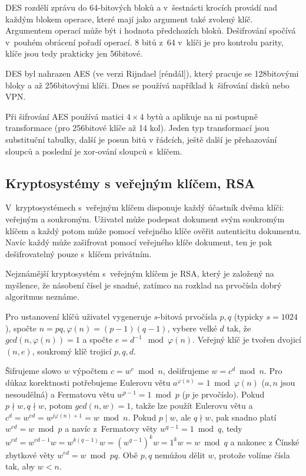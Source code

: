 DES rozdělí zprávu do 64-bitových bloků
a v~šestnácti krocích provádí nad každým blokem operace, které mají jako
argument také zvolený klíč. Argumentem operací může být i hodnota
předchozích bloků. Dešifrování spočívá v~pouhém obrácení pořadí operací.
8 bitů z~64 v~klíči je pro kontrolu parity, klíče jsou tedy prakticky
jen 56bitové.

DES byl nahrazen AES (ve verzi Rijndael [réndál]), který pracuje se
128bitovými bloky a až 256bitovými klíči. Dnes se používá například
k~šifrování disků nebo VPN.

Při šifrování AES používá matici $4 \times 4$ bytů a aplikuje na ni
postupně transformace (pro 256bitové klíče až 14 kol).
Jeden typ transformací jsou substituční tabulky,
další je posun bitů v řádcích,
ještě další je přehazování sloupců
a poslední je xor-ování sloupců s~klíčem.

\subsection{Kryptosystémy s veřejným klíčem, RSA}

V~kryptosystémech s~veřejným klíčem disponuje každý účastník dvěma
klíči: veřejným a soukromým. Uživatel může podepsat dokument svým
soukromým klíčem a každý potom může pomocí veřejného klíče ověřit
autenticitu dokumentu. Navíc každý může zašifrovat pomocí veřejného
klíče dokument, ten je pak dešifrovatelný pouze s~klíčem privátním.

Nejznámější kryptosystém s~veřejným klíčem je RSA, který je založený na
myšlence, že násobení čísel je snadné, zatímco na rozklad na prvočísla
dobrý algoritmus neznáme.

Pro ustanovení klíčů uživatel vygeneruje $s$-bitová prvočísla $p,q$
(typicky $s = 1024$), spočte $n = pq, \varphi(n) = (p-1)(q-1)$,
vybere velké $d$ tak, že $gcd(n, \varphi(n)) = 1$
a spočte $e = d^{-1} \mod \varphi(n)$. Veřejný klíč je tvořen dvojicí
$(n, e)$, soukromý klíč trojicí $p,q,d$.

Šifrujeme slowo $w$ výpočtem $c = w^e \bmod n$,
dešifrujeme $w = c^d \bmod n$.
Pro důkaz korektnosti potřebujeme Eulerovu větu $a^{\varphi(n)} = 1
\bmod \varphi(n)$ ($a,n$ jsou nesoudělná)
a Fermatovu větu $w^{p-1} = 1 \bmod p$ ($p$ je prvočíslo).
Pokud $p \nmid w, q \nmid w$, potom $gcd(n,w) = 1$, takže lze použít
Eulerovu větu a $c^d = w^{ed} = w^{j \varphi(n) + 1} = w \bmod n$.
Pokud $p \mid w$, ale $q \nmid w$,
pak snadno platí $w^{ed} = w \bmod p$
a navíc z~Fermatovy věty $w^{q-1} = 1 \bmod q$,
tedy
$w^{ed} = w^{ed - 1} w = w^{k(q-1)} w = (w^{q-1})^k w = 1^kw = w \bmod q$
a nakonec z Čínské zbytkové věty
$w^{ed} = w \bmod pq$.
Obě $p,q$ nemůžou dělit $w$, protože volíme čísla tak, aby $w < n$.

